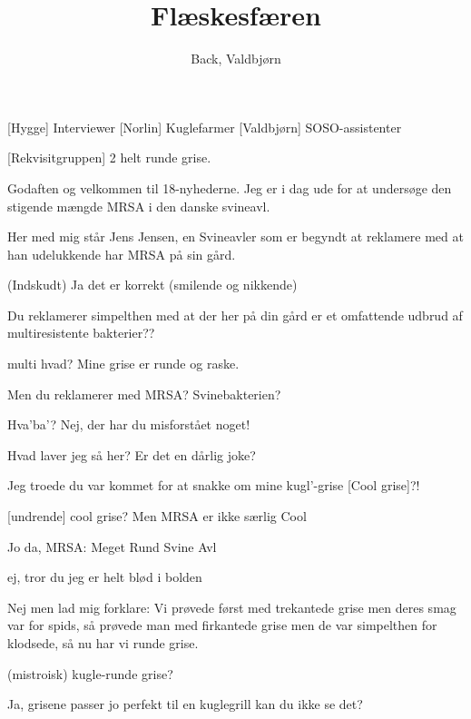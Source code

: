 \documentclass[a4paper,11pt]{article}
\title{Flæskesfæren}
\author{Back, Valdbjørn}
\begin{document}
\maketitle

\begin{roles}
    [Hygge] Interviewer
    [Norlin] Kuglefarmer
    [Valdbjørn] SOSO-assistenter
\end{roles}

\begin{props}
    [Rekvisitgruppen] 2 helt runde grise.
\end{props}


\begin{sketch}

 Godaften  og velkommen til 18-nyhederne. Jeg er i dag ude for at undersøge den stigende mængde MRSA i den danske svineavl.

 Her med mig står Jens Jensen, en Svineavler som er begyndt at reklamere med at han udelukkende har MRSA på sin gård.

 (Indskudt) Ja det er korrekt (smilende og nikkende)

 Du reklamerer simpelthen med at der her på din gård er et omfattende udbrud af multiresistente bakterier??

 multi hvad? Mine grise er runde og raske. 

 Men du reklamerer med MRSA? Svinebakterien?

 Hva'ba'? Nej, der har du misforstået noget!

 Hvad laver jeg så her? Er det en dårlig joke?

 Jeg troede du var kommet for at snakke om mine kugl'-grise [Cool grise]?!

[undrende] cool grise? Men MRSA er ikke særlig Cool

 Jo da, MRSA:  Meget Rund Svine Avl

 ej, tror du jeg er helt blød i bolden

 Nej men lad mig forklare: Vi prøvede først med trekantede grise men deres smag var for spids, så prøvede man med firkantede grise men de var simpelthen for klodsede, så nu har vi runde grise.

 (mistroisk) kugle-runde grise?

 Ja, grisene passer jo perfekt til en kuglegrill kan du ikke se det?


\end{sketch}
\end{document}
